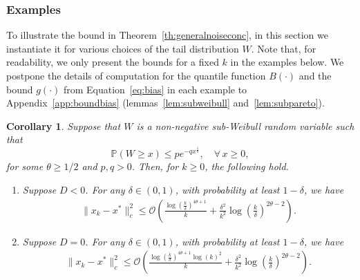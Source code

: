 \documentclass{article}
\newcommand{\lrp}[1]{\left( #1 \right)}
\newtheorem{corollary}{Corollary}[theorem]
\begin{document}
\subsubsection{Examples}\label{sec:examples}

To illustrate the bound in Theorem~\ref{th:generalnoiseconc}, in this section we instantiate it for various choices of the tail distribution $W$. Note that, for readability, we only present the bounds for a fixed $k$ in the examples below. We postpone the details of computation for the quantile function $B(\cdot)$ and the bound $g(\cdot)$ from Equation~\eqref{eq:bias} in each example to Appendix~\ref{app:boundbias} (lemmas~\ref{lem:subweibull} and~\ref{lem:subpareto}). 
\begin{corollary}\label{cor:subweibull}
    Suppose that $W$ is a non-negative sub-Weibull random variable such that
    \[ \mathbb{P}\lrp{ W \ge x} \le p e^{-q x^\frac{1}{\theta}}, \quad \forall \, x \ge 0, \] 
    for some $\theta \geq 1/2$ and $p,q> 0$. Then, %
    for $k\geq 0$, the following hold.    
    \begin{enumerate}\item\label{gauss_part1} Suppose $D < 0$. For any $\delta\in(0,1)$, with probability at least $1-\delta$, we have
    \begin{align*}
        \|x_k - x^*\|^2_c \le {\mathcal{O}}\lrp{ \frac{\log\left(\frac{k}{\delta}\right)^{4\theta+1}  }{k} + \frac{\delta^2}{k^2} \log\left(\frac{k}{\delta}\right)^{2\theta-2}}.
    \end{align*}
    \item\label{gauss_part2} Suppose $D = 0$. For any $\delta\in(0,1)$, with probability at least $1-\delta$, we have
    \begin{align*}
        \|x_k - x^*\|^2_c \le {\mathcal{O}}\lrp{ \frac{\log\left(\frac{k}{\delta}\right)^{4\theta + 1} \log(k)^2 }{k} + \frac{\delta^2}{k^2} \log\left(\frac{k}{\delta}\right)^{2\theta-2}}.

\end{align*}
\end{enumerate}
\end{corollary}
\end{document}
